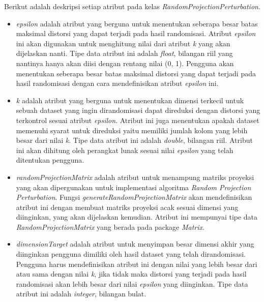 Berikut adalah deskripsi setiap atribut pada kelas \textit{RandomProjectionPerturbation}.
\begin{itemize}
	\item \textit{epsilon} adalah atribut yang berguna untuk menentukan seberapa besar batas maksimal distorsi yang dapat terjadi pada hasil randomisasi. Atribut \textit{epsilon} ini akan digunakan untuk menghitung nilai dari atribut \textit{k} yang akan dijelaskan nanti. Tipe data atribut ini adalah \textit{float}, bilangan riil yang nantinya hanya akan diisi dengan rentang nilai (0, 1). Pengguna akan menentukan seberapa besar batas maksimal distorsi yang dapat terjadi pada hasil randomisasi dengan cara mendefinisikan atribut \textit{epsilon} ini.
	\item \textit{k} adalah atribut yang berguna untuk menentukan dimensi terkecil untuk sebuah dataset yang ingin dirandomisasi dapat direduksi dengan distorsi yang terkontrol sesuai atribut \textit{epsilon}. Atribut ini juga menentukan apakah dataset memenuhi syarat untuk direduksi yaitu memiliki jumlah kolom yang lebih besar dari nilai \textit{k}. Tipe data atribut ini adalah \textit{double}, bilangan riil. Atribut ini akan dihitung oleh perangkat lunak sesuai nilai \textit{epsilon} yang telah ditentukan pengguna.
	\item \textit{randomProjectionMatrix} adalah atribut untuk menampung matriks proyeksi yang akan dipergunakan untuk implementasi algoritma \textit{Random Projection Perturbation}. Fungsi \textit{generateRandomProjectionMatrix} akan mendefinisikan atribut ini dengan membuat matriks proyeksi acak sesuai dimensi yang diinginkan, yang akan dijelaskan kemudian. Atribut ini mempunyai tipe data \textit{RandomProjectionMatrix} yang berada pada package \textit{Matrix}.
	\item \textit{dimensionTarget} adalah atribut untuk menyimpan besar dimensi akhir yang diinginkan pengguna dimiliki oleh hasil dataset yang telah dirandomisasi. Pengguna harus mendefinisikan atribut ini dengan nilai yang lebih besar dari atau sama dengan nilai \textit{k}, jika tidak maka distorsi yang terjadi pada hasil randomisasi akan lebih besar dari nilai \textit{epsilon} yang diinginkan. Tipe data atribut ini adalah \textit{integer}, bilangan bulat.
\end{itemize}


